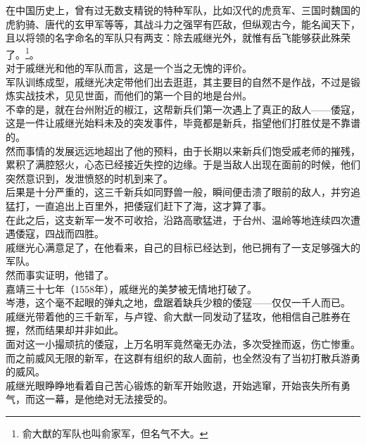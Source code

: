\begin{multicols}{\theparacolNo}
在中国历史上，曾有过无数支精锐的特种军队，比如汉代的虎贲军、三国时魏国的虎豹骑、唐代的玄甲军等等，其战斗力之强罕有匹敌，但纵观古今，能名闻天下，且以将领的名字命名的军队只有两支：除去戚继光外，就惟有岳飞能够获此殊荣了。\footnote{俞大猷的军队也叫俞家军，但名气不大。}。\\

对于戚继光和他的军队而言，这是一个当之无愧的评价。\\

军队训练成型，戚继光决定带他们出去逛逛，其主要目的自然不是作战，不过是锻炼实战技术，见见世面，而他们的第一个目的地是台州。\\

不幸的是，就在台州附近的椒江，这帮新兵们第一次遇上了真正的敌人——倭寇，这是一件让戚继光始料未及的突发事件，毕竟都是新兵，指望他们打胜仗是不靠谱的。\\

然而事情的发展远远地超出了他的预料，由于长期以来新兵们饱受戚老师的摧残，累积了满腔怒火，心态已经接近失控的边缘。于是当敌人出现在面前的时候，他们突然意识到，发泄愤怒的时机到来了。\\

后果是十分严重的，这三千新兵如同野兽一般，瞬间便击溃了眼前的敌人，并穷追猛打，一直追出上百里外，把倭寇们赶下了海，这才算了事。\\

在此之后，这支新军一发不可收拾，沿路高歌猛进，于台州、温岭等地连续四次遭遇倭寇，四战而四胜。\\

戚继光心满意足了，在他看来，自己的目标已经达到，他已拥有了一支足够强大的军队。\\

然而事实证明，他错了。\\

嘉靖三十七年（1558年），戚继光的美梦被无情地打破了。\\

岑港，这个毫不起眼的弹丸之地，盘踞着缺兵少粮的倭寇——仅仅一千人而已。\\

戚继光带着他的三千新军，与卢镗、俞大猷一同发动了猛攻，他相信自己胜券在握，然而结果却并非如此。\\

面对这一小撮顽抗的倭寇，上万名明军竟然毫无办法，多次受挫而返，伤亡惨重。而之前威风无限的新军，在这群有组织的敌人面前，也全然没有了当初打散兵游勇的威风。\\

戚继光眼睁睁地看着自己苦心锻炼的新军开始败退，开始逃窜，开始丧失所有勇气，而这一幕，是他绝对无法接受的。\\


\end{multicols}
